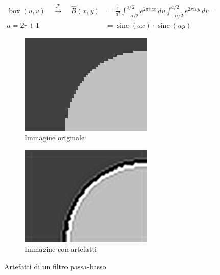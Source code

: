 \documentclass[../main.tex]{subfiles}
\begin{document}
\begin{equation}
	\begin{aligned}
		\operatorname{box}(u,v) \quad\overset{\mathcal{F}}{\longrightarrow}\quad \hat{B}(x,y) &=  \frac{1}{a^2}\int_{-a/2}^{a/2}e^{2\pi iux}\,du\int_{-a/2}^{a/2}e^{2\pi ivy}\,dv =\\
		\boxed{a = 2r + 1} \qquad\quad &= \operatorname{sinc}(ax)\cdot\operatorname{sinc}(ay)
	\end{aligned}
\end{equation}

\begin{figure}[ht]
	\centering
	\begin{subfigure}{0.4\linewidth}
		\centering
		\includegraphics[keepaspectratio, width=\linewidth]{images/ringing_orignal.png}
		\caption{Immagine originale}
	\end{subfigure}
	\hspace{20pt}
	\begin{subfigure}{0.4\linewidth}
		\centering
		\includegraphics[keepaspectratio, width=\linewidth]{images/ringing_artifact.png}
		\caption{Immagine con artefatti}
	\end{subfigure}
	\caption[Artefatti di un filtro passa-basso ideale]{
		Artefatti di un filtro passa-basso \cite{ringingImage}}
\end{figure}
\end{document}
